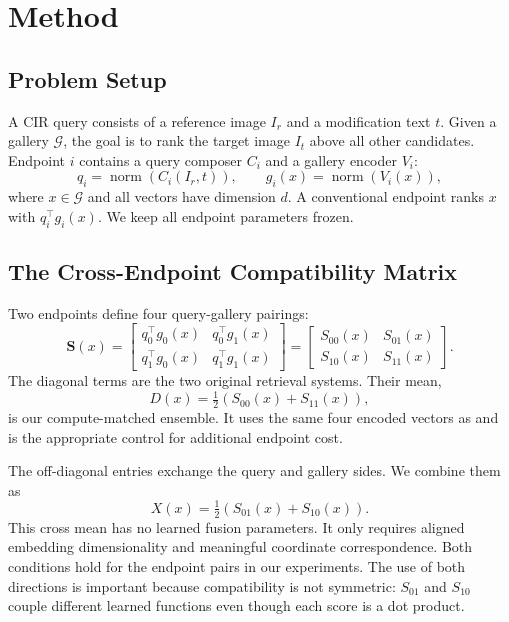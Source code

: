 \section{Method}
\label{sec:method}

\subsection{Problem Setup}

A CIR query consists of a reference image $I_r$ and a modification text $t$. Given a gallery $\mathcal{G}$, the goal is to rank the target image $I_t$ above all other candidates. Endpoint $i$ contains a query composer $C_i$ and a gallery encoder $V_i$:
\begin{equation}
q_i = \operatorname{norm}(C_i(I_r,t)), \qquad
g_i(x) = \operatorname{norm}(V_i(x)),
\label{eq:endpoints}
\end{equation}
where $x\in\mathcal{G}$ and all vectors have dimension $d$. A conventional endpoint ranks $x$ with $q_i^\top g_i(x)$. We keep all endpoint parameters frozen.

\subsection{The Cross-Endpoint Compatibility Matrix}

Two endpoints define four query-gallery pairings:
\begin{equation}
\mathbf{S}(x)=
\begin{bmatrix}
q_0^\top g_0(x) & q_0^\top g_1(x)\\
q_1^\top g_0(x) & q_1^\top g_1(x)
\end{bmatrix}
=
\begin{bmatrix}
S_{00}(x) & S_{01}(x)\\
S_{10}(x) & S_{11}(x)
\end{bmatrix}.
\label{eq:matrix}
\end{equation}
The diagonal terms are the two original retrieval systems. Their mean,
\begin{equation}
D(x)=\tfrac{1}{2}\left(S_{00}(x)+S_{11}(x)\right),
\label{eq:diagonal}
\end{equation}
is our compute-matched ensemble. It uses the same four encoded vectors as \method and is the appropriate control for additional endpoint cost.

The off-diagonal entries exchange the query and gallery sides. We combine them as
\begin{equation}
X(x)=\tfrac{1}{2}\left(S_{01}(x)+S_{10}(x)\right).
\label{eq:crossmean}
\end{equation}
This cross mean has no learned fusion parameters. It only requires aligned embedding dimensionality and meaningful coordinate correspondence. Both conditions hold for the endpoint pairs in our experiments. The use of both directions is important because compatibility is not symmetric: $S_{01}$ and $S_{10}$ couple different learned functions even though each score is a dot product.

